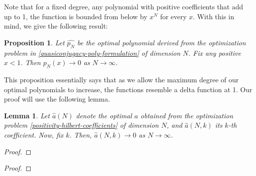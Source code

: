 \documentclass[11pt]{article}
\newtheorem{lem}[thm]{Lemma}
\newtheorem{prop}[thm]{Proposition}
\theoremstyle{definition}
\theoremstyle{remark}
\numberwithin{equation}{section}
\begin{document}
Note that for a fixed degree, any polynomial with positive coefficients that add up to 1, the function is bounded from below by $x^N$ for every $x$. With this in mind, we give the following result:

\begin{prop}\label{pointwise-convergence-zero-one-function}
Let $\hat{p_N}$ be the optimal polynomial derived from the optimization problem in \ref{quasiconjugacy-poly-formulation} of dimension $N$. Fix any positive $x<1$. Then $p_N(x) \to 0$ as $N\to \infty$. 
\end{prop}
This proposition essentially says that as we allow the maximum degree of our optimal polynomials to increase, the functions resemble a delta function at 1. Our proof will use the following lemma.
\begin{lem}\label{coefficients-vanish}
Let $\hat{a}(N)$ denote the optimal $a$ obtained from the optimization problem \ref{positivity-hilbert-coefficients} of dimension $N$, and $\hat{a}(N,k)$ its $k$-th coefficient. Now, fix $k$. Then, $\hat{a}(N,k) \to 0$ as $N\to \infty$.
\end{lem}
\begin{proof}
\end{proof}
\begin{proof}

\end{proof}
\end{document}
